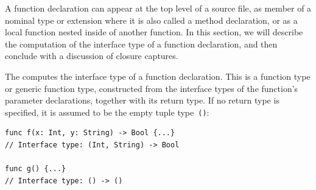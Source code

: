 \documentclass[../generics]{subfiles}
\begin{document}
A function declaration can appear at the top level of a source file, as member of a nominal type or extension where it is also called a method declaration, or as a local function nested inside of another function. In this section, we will describe the computation of the interface type of a function declaration, and then conclude with a discussion of closure captures.

The  computes the interface type of a function declaration. This is a function type or generic function type, constructed from the interface types of the function's parameter declarations, together with its return type. If no return type is specified, it is assumed to be the empty tuple type~\texttt{()}:
\begin{Verbatim}
func f(x: Int, y: String) -> Bool {...}
// Interface type: (Int, String) -> Bool

func g() {...}
// Interface type: () -> ()
\end{Verbatim}
\end{document}
